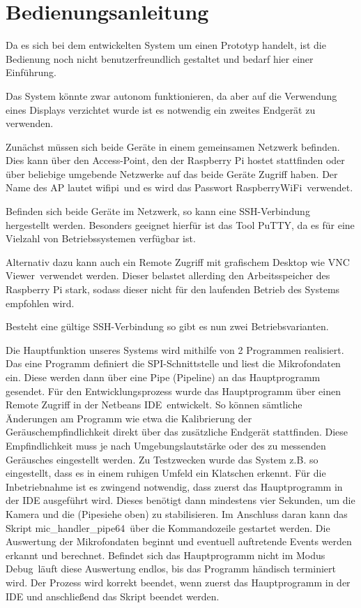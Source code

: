 \section{Bedienungsanleitung}

Da es sich bei dem entwickelten System um einen Prototyp handelt, ist die Bedienung noch nicht benutzerfreundlich gestaltet und bedarf hier einer Einführung.

Das System könnte zwar autonom funktionieren, da aber auf die Verwendung eines Displays verzichtet wurde ist es notwendig ein zweites Endgerät zu verwenden. 

Zunächst müssen sich beide Geräte in einem gemeinsamen Netzwerk befinden. Dies kann über den Access-Point, den der Raspberry Pi hostet stattfinden oder über beliebige umgebende Netzwerke auf das beide Geräte Zugriff haben. Der Name des AP lautet \glqq wifipi\grqq\ und es wird das Passwort \glqq RaspberryWiFi\grqq\ verwendet.

Befinden sich beide Geräte im Netzwerk, so kann eine SSH-Verbindung hergestellt werden. Besonders geeignet hierfür ist das Tool \glqq PuTTY\grqq, da es für eine Vielzahl von Betriebssystemen verfügbar ist. 

Alternativ dazu kann auch ein Remote Zugriff mit grafischem Desktop wie \glqq VNC Viewer\grqq\ verwendet werden. Dieser belastet allerding den Arbeitsspeicher des Raspberry Pi stark, sodass dieser nicht für den laufenden Betrieb des Systems empfohlen wird. 

Besteht eine gültige SSH-Verbindung so gibt es nun zwei Betriebsvarianten. 

Die Hauptfunktion unseres Systems wird mithilfe von 2 Programmen realisiert. Das eine Programm definiert die SPI-Schnittstelle und liest die Mikrofondaten ein. Diese werden dann über eine Pipe (Pipeline) an das Hauptprogramm gesendet. Für den Entwicklungsprozess wurde das Hauptprogramm über einen Remote Zugriff in der \glqq Netbeans IDE\grqq\ entwickelt. So können sämtliche Änderungen am Programm wie etwa die Kalibrierung der Geräuschempfindlichkeit direkt über das zusätzliche Endgerät stattfinden. Diese Empfindlichkeit muss je nach Umgebungslautstärke oder des zu messenden Geräusches eingestellt werden. Zu Testzwecken wurde das System z.B. so eingestellt, dass es in einem ruhigen Umfeld ein Klatschen erkennt. Für die Inbetriebnahme ist es zwingend notwendig, dass zuerst das Hauptprogramm in der IDE ausgeführt wird. Dieses benötigt dann mindestens vier Sekunden, um die Kamera und die (Pipesiehe oben) zu stabilisieren. Im Anschluss daran kann das Skript \glqq mic\_handler\_pipe64\grqq\ über die Kommandozeile gestartet werden. Die Auswertung der Mikrofondaten beginnt und eventuell auftretende Events werden erkannt und berechnet. Befindet sich das Hauptprogramm nicht im Modus \glqq Debug\grqq\ läuft diese Auswertung endlos, bis das Programm händisch terminiert wird. Der Prozess wird korrekt beendet, wenn zuerst das Hauptprogramm in der IDE und anschließend das Skript beendet werden.


